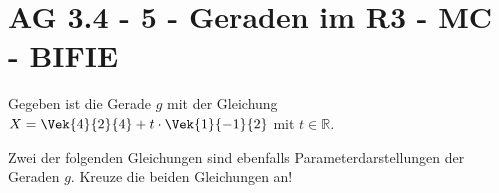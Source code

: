 \section{AG 3.4 - 5 - Geraden im R3 - MC - BIFIE}

\begin{beispiel}[AG 3.4]{1} %
Gegeben ist die Gerade $g$ mit der Gleichung $X=\Vek{4}{2}{4}+t\cdot\Vek{1}{-1}{2}$ mit $t\in\mathbb{R}$.

Zwei der folgenden Gleichungen sind ebenfalls Parameterdarstellungen der Geraden $g$. Kreuze die beiden Gleichungen an!
\end{beispiel}